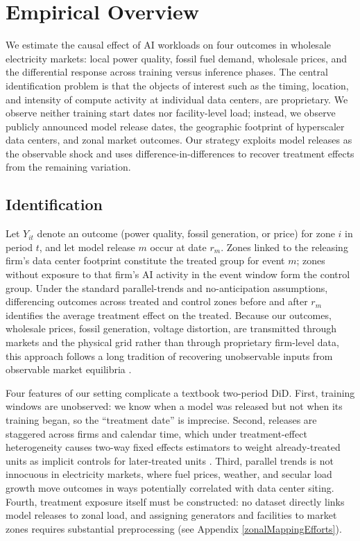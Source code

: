 \documentclass[a4paper,fleqn,longmktitle]{cas-sc}
\begin{document}
\section{Empirical Overview}\label{Sec::Methods}

We estimate the causal effect of AI workloads on four outcomes in wholesale electricity markets: local power quality, fossil fuel demand, wholesale prices, and the differential response across training versus inference phases. The central identification problem is that the objects of interest such as the timing, location, and intensity of compute activity at individual data centers, are proprietary. We observe neither training start dates nor facility-level load; instead, we observe publicly announced model release dates, the geographic footprint of hyperscaler data centers, and zonal market outcomes. Our strategy exploits model releases as the observable shock and uses difference-in-differences to recover treatment effects from the remaining variation.

\subsection{Identification}\label{EconometricModel}

Let $Y_{it}$ denote an outcome (power quality, fossil generation, or price) for zone $i$ in period $t$, and let model release $m$ occur at date $r_m$. Zones linked to the releasing firm's data center footprint constitute the treated group for event $m$; zones without exposure to that firm's AI activity in the event window form the control group. Under the standard parallel-trends and no-anticipation assumptions, differencing outcomes across treated and control zones before and after $r_m$ identifies the average treatment effect on the treated. Because our outcomes, wholesale prices, fossil generation, voltage distortion, are transmitted through markets and the physical grid rather than through proprietary firm-level data, this approach follows a long tradition of recovering unobservable inputs from observable market equilibria \citep{fowlie2012industrial, card1994minimum, greenstone2014environmental}.

Four features of our setting complicate a textbook two-period DiD. First, training windows are unobserved: we know when a model was released but not when its training began, so the ``treatment date'' is imprecise. Second, releases are staggered across firms and calendar time, which under treatment-effect heterogeneity causes two-way fixed effects estimators to weight already-treated units as implicit controls for later-treated units \citep{goodman2021difference, sun2021treatment, callaway2021difference, borusyak2024revisiting}. Third, parallel trends is not innocuous in electricity markets, where fuel prices, weather, and secular load growth move outcomes in ways potentially correlated with data center siting. Fourth, treatment exposure itself must be constructed: no dataset directly links model releases to zonal load, and assigning generators and facilities to market zones requires substantial preprocessing (see Appendix \ref{zonalMappingEfforts}).
\end{document}
